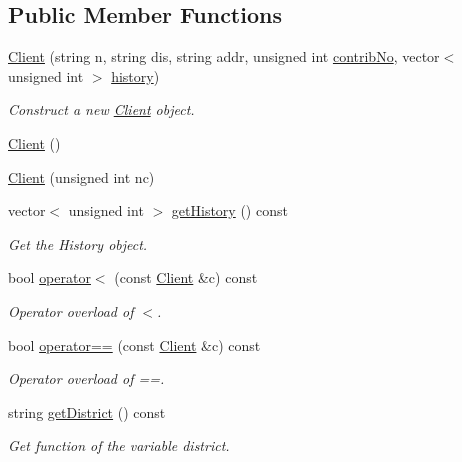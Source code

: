 \subsection*{Public Member Functions}
\begin{DoxyCompactItemize}
\item 
\hyperlink{classClient_ae054d039da064a80f3bde9e126a58e23}{Client} (string n, string dis, string addr, unsigned int \hyperlink{classPerson_a55eea8ffb71b88d84ea43a6be15a2eb4}{contrib\+No}, vector$<$ unsigned int $>$ \hyperlink{classClient_afceda4b2e1aa4cf7cb52478d5e679bad}{history})
\begin{DoxyCompactList}\small\item\em Construct a new \hyperlink{classClient}{Client} object. \end{DoxyCompactList}\item 
\hyperlink{classClient_ae51af7aa6b8f591496a8f6a4a87a14bf}{Client} ()
\item 
\hyperlink{classClient_a2df8218a19b72961a1301392e356711f}{Client} (unsigned int nc)
\item 
vector$<$ unsigned int $>$ \hyperlink{classClient_a5a2d79bb60bb1846a14263d156654c36}{get\+History} () const
\begin{DoxyCompactList}\small\item\em Get the History object. \end{DoxyCompactList}\item 
bool \hyperlink{classClient_ada079699bae9cf8b0b729c82f0940487}{operator$<$} (const \hyperlink{classClient}{Client} \&c) const
\begin{DoxyCompactList}\small\item\em Operator overload of $<$. \end{DoxyCompactList}\item 
bool \hyperlink{classClient_a7dfa59dc82c7ef516edc0eb6719b97f0}{operator==} (const \hyperlink{classClient}{Client} \&c) const
\begin{DoxyCompactList}\small\item\em Operator overload of ==. \end{DoxyCompactList}\item 
string \hyperlink{classClient_aa6acbbfc2c1717d7303a3db86ac22058}{get\+District} () const
\begin{DoxyCompactList}\small\item\em Get function of the variable district. \end{DoxyCompactList}\end{DoxyCompactItemize}
